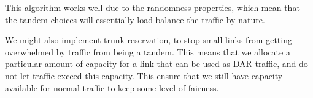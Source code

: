 \begin{enumerate}[label=(\alph*)]
    This algorithm works well due to the randomness properties, which mean that the tandem choices will essentially load balance the traffic by nature.

    We might also implement trunk reservation, to stop small links from getting overwhelmed by traffic from being a tandem. This means that we allocate a particular amount of capacity for a link that can be used as DAR traffic, and do not let traffic exceed this capacity. This ensure that we still have capacity available for normal traffic to keep some level of fairness.


        
\end{enumerate}

